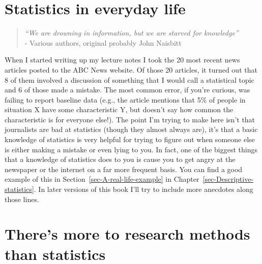 \documentclass[
  a4paper,
]{book}
\begin{document}
\hypertarget{statistics-in-everyday-life}{%
\section{Statistics in everyday
life}\label{statistics-in-everyday-life}}

\begin{quote}
\emph{``We are drowning in information,\emph{\hfill\break
}but we are starved for knowledge''}\\
- Various authors, original probably John Naisbitt
\end{quote}

When I started writing up my lecture notes I took the 20 most recent
news articles posted to the ABC News website. Of those 20 articles, it
turned out that 8 of them involved a discussion of something that I
would call a statistical topic and 6 of those made a mistake. The most
common error, if you're curious, was failing to report baseline data
(e.g., the article mentions that 5\% of people in situation X have some
characteristic Y, but doesn't say how common the characteristic is for
everyone else!). The point I'm trying to make here isn't that
journalists are bad at statistics (though they almost always are), it's
that a basic knowledge of statistics is very helpful for trying to
figure out when someone else is either making a mistake or even lying to
you. In fact, one of the biggest things that a knowledge of statistics
does to you is cause you to get angry at the newspaper or the internet
on a far more frequent basis. You can find a good example of this in
Section~\ref{sec-A-real-life-example} in
Chapter~\ref{sec-Descriptive-statistics}. In later versions of this book
I'll try to include more anecdotes along those lines.

\hypertarget{theres-more-to-research-methods-than-statistics}{%
\section{There's more to research methods than
statistics}\label{theres-more-to-research-methods-than-statistics}}
\end{document}
